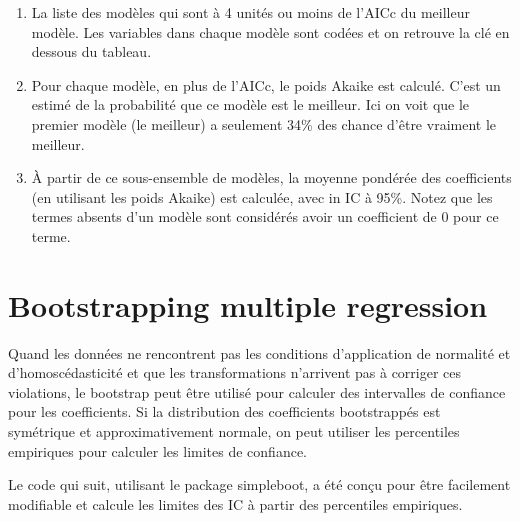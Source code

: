 \documentclass[12pt,]{book}
\providecommand{\tightlist}{%
  \setlength{\itemsep}{0pt}\setlength{\parskip}{0pt}}
\begin{document}
\begin{enumerate}
\def\labelenumi{\arabic{enumi}.}
\tightlist
\item
  La liste des modèles qui sont à 4 unités ou moins de l'AICc du meilleur modèle. Les variables dans chaque modèle sont codées et on retrouve la clé en dessous du tableau.
\item
  Pour chaque modèle, en plus de l'AICc, le poids Akaike est calculé. C'est un estimé de la probabilité que ce modèle est le meilleur. Ici on voit que le premier modèle (le meilleur) a seulement 34\% des chance d'être vraiment le meilleur.
\item
  À partir de ce sous-ensemble de modèles, la moyenne pondérée des coefficients (en utilisant les poids Akaike) est calculée, avec in IC à 95\%. Notez que les termes absents d'un modèle sont considérés avoir un coefficient de 0 pour ce terme.
\end{enumerate}

\hypertarget{bootstrapping-multiple-regression}{%
\section{Bootstrapping multiple regression}\label{bootstrapping-multiple-regression}}

Quand les données ne rencontrent pas les conditions d'application de normalité et d'homoscédasticité et que les transformations n'arrivent pas à corriger ces violations, le bootstrap peut être utilisé pour calculer des intervalles de confiance pour les coefficients. Si la distribution des coefficients bootstrappés est symétrique et approximativement normale, on peut utiliser les percentiles empiriques pour calculer les limites de confiance.

Le code qui suit, utilisant le package simpleboot, a été conçu pour être facilement modifiable et calcule les limites des IC à partir des percentiles empiriques.
\end{document}
